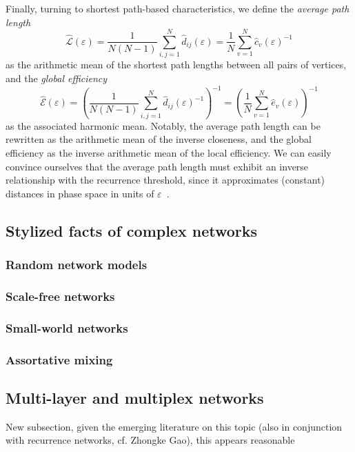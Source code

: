 Finally, turning to shortest path-based characteristics, we define the \textit{average path length}
\begin{equation}
\hat{\mathcal{L}}(\varepsilon)=\frac{1}{N(N-1)} \sum_{i,j=1}^N \hat{d}_{ij}(\varepsilon) = \frac{1}{N} \sum_{v=1}^N \hat{c}_v(\varepsilon)^{-1}
\label{eq:apl}
\end{equation}
\noindent
as the arithmetic mean of the shortest path lengths between all pairs of vertices, and the \textit{global efficiency}
\begin{equation}
\hat{\mathcal{E}}(\varepsilon)=\left(\frac{1}{N(N-1)} \sum_{i,j=1}^N \hat{d}_{ij}(\varepsilon)^{-1} \right)^{-1} = \left( \frac{1}{N} \sum_{v=1}^N \hat{e}_v(\varepsilon) \right)^{-1}
\label{eq:globefficiency}
\end{equation}
\noindent
as the associated harmonic mean. Notably, the average path length can be rewritten as the arithmetic mean of the inverse closeness, and the global efficiency as the inverse arithmetic mean of the local efficiency. We can easily convince ourselves that the average path length must exhibit an inverse relationship with the recurrence threshold, since it approximates (constant) distances in phase space in units of $\varepsilon$~\cite{Donner2010a}.


	\subsection{Stylized facts of complex networks}
		\subsubsection{Random network models}
		\subsubsection{Scale-free networks}
		\subsubsection{Small-world networks}
		\subsubsection{Assortative mixing}

	\subsection{Multi-layer and multiplex networks}
	New subsection, given the emerging literature on this topic (also in conjunction with recurrence networks, cf. Zhongke Gao), this appears reasonable

